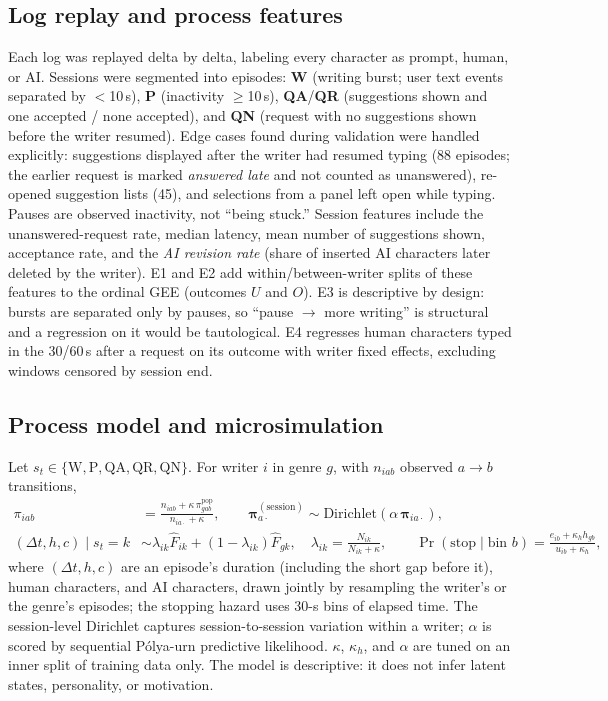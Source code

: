 \documentclass[10pt]{article}
\begin{document}
\subsection{Log replay and process features}
Each log was replayed delta by delta, labeling every character as prompt, human, or AI. Sessions were segmented into episodes:
\textbf{W} (writing burst; user text events separated by $<$10\,s),
\textbf{P} (inactivity $\geq$10\,s),
\textbf{QA}/\textbf{QR} (suggestions shown and one accepted / none accepted),
and \textbf{QN} (request with no suggestions shown before the writer resumed).
Edge cases found during validation were handled explicitly: suggestions displayed after the writer had resumed typing (88 episodes; the earlier request is marked \emph{answered late} and not counted as unanswered), re-opened suggestion lists (45), and selections from a panel left open while typing.
Pauses are observed inactivity, not ``being stuck.''
Session features include the unanswered-request rate, median latency, mean number of suggestions shown, acceptance rate, and the \emph{AI revision rate} (share of inserted AI characters later deleted by the writer).
E1 and E2 add within/between-writer splits of these features to the ordinal GEE (outcomes $U$ and $O$). E3 is descriptive by design: bursts are separated only by pauses, so ``pause $\rightarrow$ more writing'' is structural and a regression on it would be tautological. E4 regresses human characters typed in the 30/60\,s after a request on its outcome with writer fixed effects, excluding windows censored by session end.

\subsection{Process model and microsimulation}
Let $s_t\in\{\mathrm{W},\mathrm{P},\mathrm{QA},\mathrm{QR},\mathrm{QN}\}$. For writer $i$ in genre $g$, with $n_{iab}$ observed $a\!\to\!b$ transitions,
\begin{align}
\pi_{iab} &= \frac{n_{iab}+\kappa\,\pi^{\mathrm{pop}}_{gab}}{n_{ia\cdot}+\kappa}, \qquad
\boldsymbol\pi^{(\text{session})}_{a\cdot}\sim \mathrm{Dirichlet}(\alpha\,\boldsymbol\pi_{ia\cdot}),\\
(\Delta t, h, c)\mid s_t{=}k &\sim \lambda_{ik}\hat F_{ik}+(1-\lambda_{ik})\hat F_{gk},\quad \lambda_{ik}=\frac{N_{ik}}{N_{ik}+\kappa},\qquad
\Pr(\text{stop}\mid \text{bin } b) = \frac{e_{ib}+\kappa_h h_{gb}}{u_{ib}+\kappa_h},
\end{align}
where $(\Delta t, h, c)$ are an episode's duration (including the short gap before it), human characters, and AI characters, drawn jointly by resampling the writer's or the genre's episodes; the stopping hazard uses 30-s bins of elapsed time.
The session-level Dirichlet captures session-to-session variation within a writer; $\alpha$ is scored by sequential P\'olya-urn predictive likelihood.
$\kappa$, $\kappa_h$, and $\alpha$ are tuned on an inner split of training data only.
The model is descriptive: it does not infer latent states, personality, or motivation.
\end{document}
